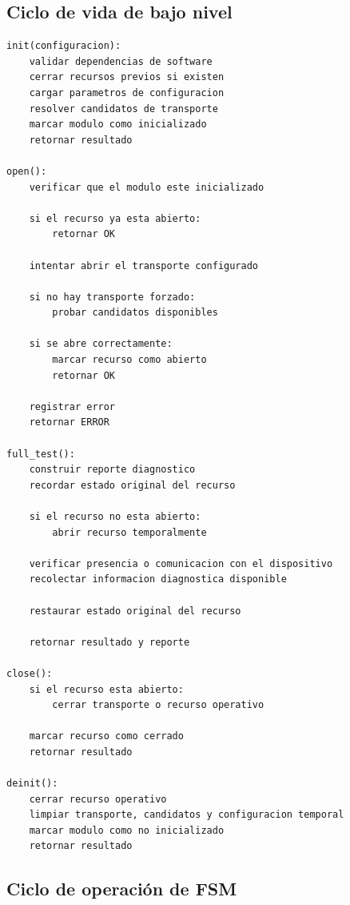 \subsection{Ciclo de vida de bajo nivel}

\begin{lstlisting}[style=pseudocodigo, caption={Pseudocódigo del ciclo de vida de un módulo de bajo nivel.}, label={lst:ciclo_vida_ll}]
init(configuracion):
    validar dependencias de software
    cerrar recursos previos si existen
    cargar parametros de configuracion
    resolver candidatos de transporte
    marcar modulo como inicializado
    retornar resultado

open():
    verificar que el modulo este inicializado

    si el recurso ya esta abierto:
        retornar OK

    intentar abrir el transporte configurado

    si no hay transporte forzado:
        probar candidatos disponibles

    si se abre correctamente:
        marcar recurso como abierto
        retornar OK

    registrar error
    retornar ERROR

full_test():
    construir reporte diagnostico
    recordar estado original del recurso

    si el recurso no esta abierto:
        abrir recurso temporalmente

    verificar presencia o comunicacion con el dispositivo
    recolectar informacion diagnostica disponible

    restaurar estado original del recurso

    retornar resultado y reporte

close():
    si el recurso esta abierto:
        cerrar transporte o recurso operativo

    marcar recurso como cerrado
    retornar resultado

deinit():
    cerrar recurso operativo
    limpiar transporte, candidatos y configuracion temporal
    marcar modulo como no inicializado
    retornar resultado
\end{lstlisting}

\subsection{Ciclo de operación de FSM}

